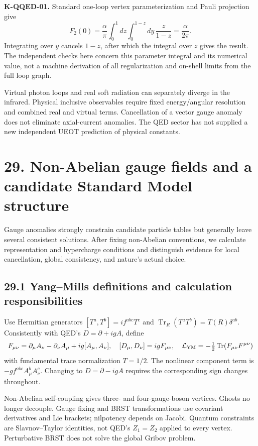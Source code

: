 \documentclass[
  11pt,
  oneside]{book}
\begin{document}
\textbf{K-QQED-01.} Standard one-loop vertex parameterization and Pauli
projection give \[
F_2(0)=\frac{\alpha}{\pi}
\int_0^1dz\int_0^{1-z}dy\,\frac{z}{1-z}
=\frac{\alpha}{2\pi}.
\] Integrating over \(y\) cancels \(1-z\), after which the integral over
\(z\) gives the result. The independent checks here concern this
parameter integral and its numerical value, not a machine derivation of
all regularization and on-shell limits from the full loop graph.

Virtual photon loops and real soft radiation can separately diverge in
the infrared. Physical inclusive observables require fixed
energy/angular resolution and combined real and virtual terms.
Cancellation of a vector gauge anomaly does not eliminate axial-current
anomalies. The QED sector has not supplied a new independent UEOT
prediction of physical constants.

\chapter{29. Non-Abelian gauge fields and a candidate Standard Model
structure}\label{ch-29}

Gauge anomalies strongly constrain candidate particle tables but
generally leave several consistent solutions. After fixing non-Abelian
conventions, we calculate representation and hypercharge conditions and
distinguish evidence for local cancellation, global consistency, and
nature's actual choice.

\section{29.1 Yang--Mills definitions and calculation responsibilities}

Use Hermitian generators \([T^a,T^b]=if^{abc}T^c\) and
\(\operatorname{Tr}_R(T^aT^b)=T(R)\delta^{ab}\). Consistently with QED's
\(D=\partial+igA\), define \[
F_{\mu\nu}=\partial_\mu A_\nu-\partial_\nu A_\mu+ig[A_\mu,A_\nu],
\quad [D_\mu,D_\nu]=igF_{\mu\nu},
\quad\mathcal L_{\rm YM}=-\tfrac12\operatorname{Tr}(F_{\mu\nu}F^{\mu\nu})
\] with fundamental trace normalization \(T=1/2\). The nonlinear
component term is \(-g f^{abc}A_\mu^bA_\nu^c\). Changing to
\(D=\partial-igA\) requires the corresponding sign changes throughout.

Non-Abelian self-coupling gives three- and four-gauge-boson vertices.
Ghosts no longer decouple. Gauge fixing and BRST transformations use
covariant derivatives and Lie brackets; nilpotency depends on Jacobi.
Quantum constraints are Slavnov--Taylor identities, not QED's
\(Z_1=Z_2\) applied to every vertex. Perturbative BRST does not solve
the global Gribov problem.
\end{document}
